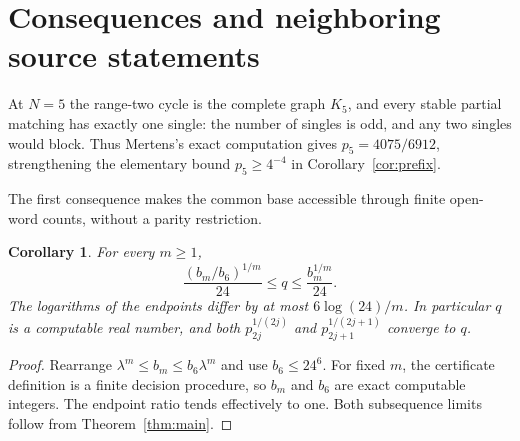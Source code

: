 \documentclass[11pt]{article}
\newtheorem{corollary}[theorem]{Corollary}
\begin{document}
\section{Consequences and neighboring source statements}
At $N=5$ the range-two cycle is the complete graph $K_5$, and every
stable partial matching has exactly one single: the number of singles is
odd, and any two singles would block. Thus Mertens's exact computation
\cite[Section~5, equation~(21b)]{mertenssmall2015} gives
$p_5=4075/6912$, strengthening the elementary bound $p_5\geq4^{-4}$
in Corollary~\ref{cor:prefix}.

The first consequence makes the common base accessible through finite
open-word counts, without a parity restriction.
\begin{corollary}\label{cor:enclosures}
For every $m\geq1$,
\[
 \frac{(b_m/b_6)^{1/m}}{24}\leq q\leq\frac{b_m^{1/m}}{24}.
\]
The logarithms of the endpoints differ by at most $6\log(24)/m$.
In particular $q$ is a computable real number, and both
$p_{2j}^{1/(2j)}$ and $p_{2j+1}^{1/(2j+1)}$ converge to $q$.
\end{corollary}
\begin{proof}
Rearrange $\lambda^m\leq b_m\leq b_6\lambda^m$ and use
$b_6\leq24^6$. For fixed $m$, the certificate definition is a finite
decision procedure, so $b_m$ and $b_6$ are exact computable integers.
The endpoint ratio tends effectively to one. Both subsequence limits
follow from Theorem~\ref{thm:main}.
\end{proof}
\end{document}

